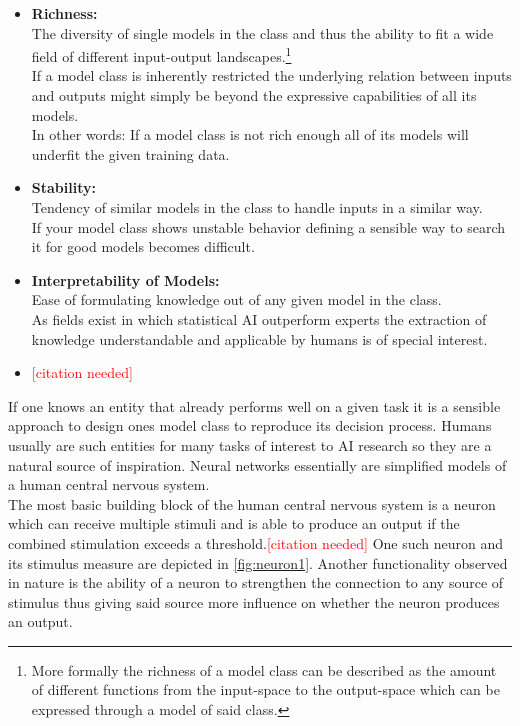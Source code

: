 \begin{itemize}
	\item \textbf{Richness:}\\
	The diversity of single models in the class and thus the ability to fit a wide field of different input-output landscapes.\footnote{
		More formally the richness of a model class can be described as the amount of different functions from the input-space to the output-space which can be expressed through a model of said class.}\\
	If a model class is inherently restricted the underlying relation between inputs and outputs might simply be beyond the expressive capabilities of all its models.\\
	In other words: If a model class is not rich enough all of its models will underfit the given training data.
	\item \textbf{Stability:}\\ 
	Tendency of similar models in the class to handle inputs in a similar way.\\
	If your model class shows unstable behavior defining a sensible way to search it for good models becomes difficult.
	\item \textbf{Interpretability of Models:}\\
	 Ease of formulating knowledge out of any given model in the class.\\
	 As fields exist in which statistical AI outperform experts the extraction of knowledge understandable and applicable by humans is of special interest.
	\item \textcolor{red}
	{[citation needed]}
\end{itemize}
If one knows an entity that already performs well on a given task it is a sensible approach to design ones model class to reproduce its decision process. Humans usually are such entities for many tasks of interest to AI research so they are a natural source of inspiration. Neural networks essentially are simplified models of a human central nervous system. \\
The most basic building block of the human central nervous system is a neuron which can receive multiple stimuli and is able to produce an output if the combined stimulation exceeds a threshold.\textcolor{red}{[citation needed]} One such neuron and its stimulus measure are depicted in \ref{fig:neuron1}. Another functionality observed in nature is the ability of a neuron to strengthen the connection to any source of stimulus thus giving said source more influence on whether the neuron produces an output. 
